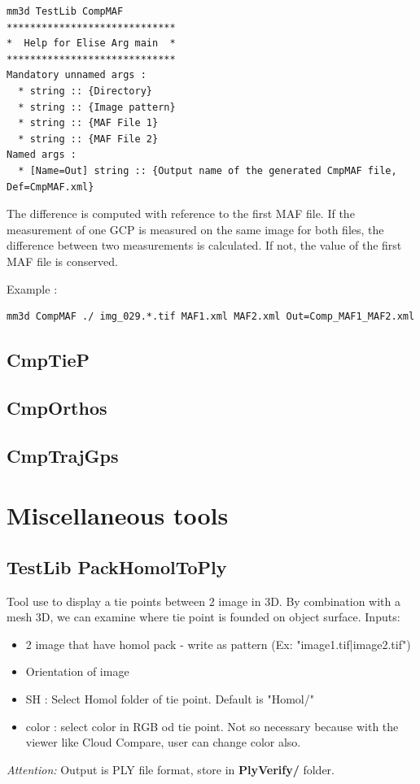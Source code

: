 \begin{verbatim}
mm3d TestLib CompMAF
*****************************
*  Help for Elise Arg main  *
*****************************
Mandatory unnamed args : 
  * string :: {Directory}
  * string :: {Image pattern}
  * string :: {MAF File 1}
  * string :: {MAF File 2}
Named args : 
  * [Name=Out] string :: {Output name of the generated CmpMAF file, Def=CmpMAF.xml}

\end{verbatim}

The difference is computed with reference to the first MAF file. If the measurement of one GCP is measured on the same image for both files, the difference between two measurements is calculated. If not, the value of the first MAF file is conserved.

Example :
\begin{verbatim}
mm3d CompMAF ./ img_029.*.tif MAF1.xml MAF2.xml Out=Comp_MAF1_MAF2.xml
\end{verbatim}

\subsection{CmpTieP}

\subsection{CmpOrthos}

\subsection{CmpTrajGps}


\section{Miscellaneous tools}

\subsection{TestLib PackHomolToPly}
Tool use to display a tie points between 2 image in 3D. By combination with a mesh 3D, we can examine where tie point is founded on object surface.
Inputs:
\begin{itemize}
\item 2 image that have homol pack - write as pattern (Ex: "image1.tif|image2.tif")
\item Orientation of image
\item SH : Select Homol folder of tie point. Default is "Homol/"
\item color : select color in RGB od tie point. Not so necessary because with the viewer like Cloud Compare, user can change color also.
\end{itemize}
\textit{Attention:} Output is PLY file format, store in \textbf{PlyVerify/} folder.

